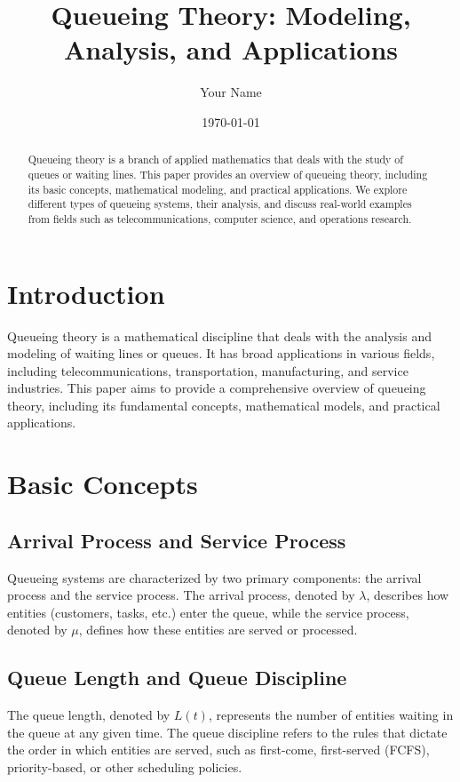\documentclass{article}
\title{Queueing Theory: Modeling, Analysis, and Applications}
\author{Your Name}
\date{\today}
\begin{document}
\maketitle

\begin{abstract}
Queueing theory is a branch of applied mathematics that deals with the study of queues or waiting lines. This paper provides an overview of queueing theory, including its basic concepts, mathematical modeling, and practical applications. We explore different types of queueing systems, their analysis, and discuss real-world examples from fields such as telecommunications, computer science, and operations research.
\end{abstract}

\section{Introduction}

Queueing theory is a mathematical discipline that deals with the analysis and modeling of waiting lines or queues. It has broad applications in various fields, including telecommunications, transportation, manufacturing, and service industries. This paper aims to provide a comprehensive overview of queueing theory, including its fundamental concepts, mathematical models, and practical applications.

\section{Basic Concepts}

\subsection{Arrival Process and Service Process}

Queueing systems are characterized by two primary components: the arrival process and the service process. The arrival process, denoted by $\lambda$, describes how entities (customers, tasks, etc.) enter the queue, while the service process, denoted by $\mu$, defines how these entities are served or processed.

\subsection{Queue Length and Queue Discipline}

The queue length, denoted by $L(t)$, represents the number of entities waiting in the queue at any given time. The queue discipline refers to the rules that dictate the order in which entities are served, such as first-come, first-served (FCFS), priority-based, or other scheduling policies.
\end{document}
